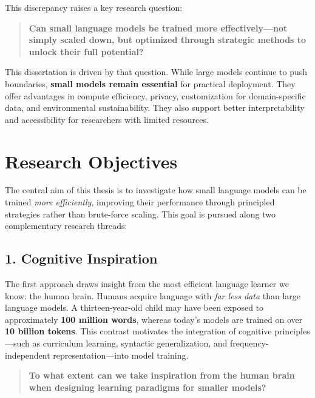 This discrepancy raises a key research question:

\begin{quote}
\textbf{Can small language models be trained more effectively—not simply scaled down, but optimized through strategic methods to unlock their full potential?}
\end{quote}


This dissertation is driven by that question. While large models continue to push boundaries, \textbf{small models remain essential} for practical deployment. They offer advantages in compute efficiency, privacy, customization for domain-specific data, and environmental sustainability. They also support better interpretability and accessibility for researchers with limited resources.


\section*{Research Objectives}

The central aim of this thesis is to investigate how small language models can be trained \emph{more efficiently}, improving their performance through principled strategies rather than brute-force scaling. This goal is pursued along two complementary research threads:


\subsection*{1. Cognitive Inspiration}

The first approach draws insight from the most efficient language learner we know: the human brain. Humans acquire language with \emph{far less data} than large language models. A thirteen-year-old child may have been exposed to approximately \textbf{100 million words}, whereas today’s models are trained on over \textbf{10 billion tokens}. This contrast motivates the integration of cognitive principles—such as curriculum learning, syntactic generalization, and frequency-independent representation—into model training.

\begin{quote}
\textbf{To what extent can we take inspiration from the human brain when designing learning paradigms for smaller models?} 
\end{quote}

